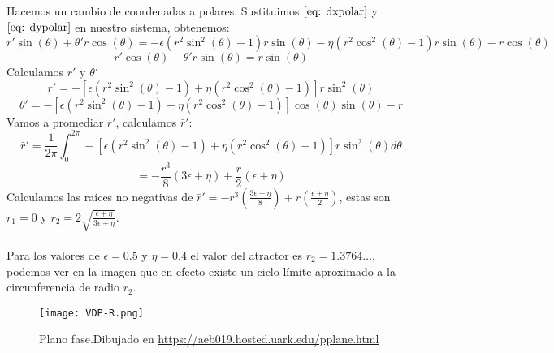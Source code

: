 Hacemos un cambio de coordenadas a polares. Sustituimos $\eqref{eq: dxpolar}$ y
$\eqref{eq: dypolar}$ en nuestro sistema, obtenemos:
$$r'\sin(\theta)+\theta'r\cos(\theta)=-\epsilon(r^2\sin^2(\theta)-1)r\sin(\theta)-\eta(r^2\cos^2(\theta)-1)r\sin(\theta)-r\cos(\theta)$$
$$r'\cos(\theta)-\theta'r\sin(\theta)=r\sin(\theta)$$
Calculamos $r'$ y $\theta'$
\begin{equation}\label{eq: drvdpr}
	r'=-[\epsilon(r^2\sin^2(\theta)-1)+\eta(r^2\cos^2(\theta)-1)]r\sin^2(\theta)
\end{equation}
$$\theta'=-[\epsilon(r^2\sin^2(\theta)-1)+\eta(r^2\cos^2(\theta)-1)]\cos(\theta)\sin(\theta)-r$$
Vamos a promediar $r'$, calculamos $\bar{r}'$:
$$\bar{r}'=\frac{1}{2\pi}\int_0^{2\pi}-[\epsilon(r^2\sin^2(\theta)-1)+\eta(r^2\cos^2(\theta)-1)]r\sin^2(\theta)d\theta$$
$$=-\frac{r^3}{8}(3\epsilon+\eta)+\frac{r}{2}(\epsilon+\eta)$$
Calculamos las raíces no negativas de $\bar{r}'=-r^3(\frac{3\epsilon+\eta}{8})+r(\frac{\epsilon+\eta}{2})$, estas son
$r_1=0$ y $r_2=2\sqrt{\frac{\epsilon+\eta}{3\epsilon+\eta}}$.\\
\\Para los valores de $\epsilon=0.5$ y $\eta=0.4$ el valor del atractor es $r_2=1.3764\dots$, podemos ver en la imagen que en efecto
existe un ciclo límite aproximado a la circunferencia de radio $r_2$.

\begin{figure}[h]
	\centering
	\texttt{[image: VDP-R.png]}
	\caption{Plano fase.Dibujado en \href{https://aeb019.hosted.uark.edu/pplane.html}{https://aeb019.hosted.uark.edu/pplane.html}}
\end{figure}
\newpage
